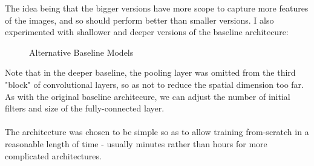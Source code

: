 \documentclass[11pt]{article} %
\theoremstyle{plain}
\theoremstyle{definition}
\begin{document}
\noindent
The idea being that the bigger versions have more scope to capture more features of the images, and so should perform better than smaller versions. I also experimented with shallower and deeper versions of the baseline architecure:
\begin{figure}[!ht]
\centering
{}
\caption{Alternative Baseline Models}
\label{fig:Baseline_Alts}
\end{figure}
\FloatBarrier
\noindent
Note that in the deeper baseline, the pooling layer was omitted from the third "block" of convolutional layers, so as not to reduce the spatial dimension too far. As with the original baseline architecure, we can adjust the number of initial filters and size of the fully-connected layer.
\\
\\
\noindent
The architecture was chosen to be simple so as to allow training from-scratch in a reasonable length of time - usually minutes rather than hours for more complicated architectures.
\end{document}
